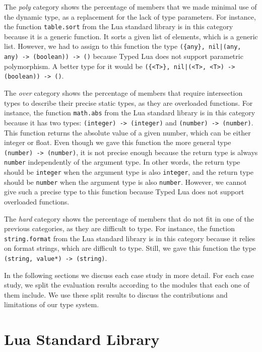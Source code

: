The \emph{poly} category shows the percentage of members that
we made minimal use of the dynamic type, as a replacement for the
lack of type parameters.
For instance, the function \texttt{table.sort} from the Lua
standard library is in this category because it is a generic function.
It sorts a given list of elements, which is a generic list.
However, we had to assign to this function the type
\texttt{(\{any\}, nil|(any, any) -> (boolean)) -> ()} because
Typed Lua does not support parametric polymorphism.
A better type for it would be
\texttt{(\{<T>\}, nil|(<T>, <T>) -> (boolean)) -> ()}.

The \emph{over} category shows the percentage of members that
require intersection types to describe their precise static types,
as they are overloaded functions.
For instance, the function \texttt{math.abs} from the Lua
standard library is in this category because it has two types:
\texttt{(integer) -> (integer)} and \texttt{(number) -> (number)}.
This function returns the absolute value of a given number,
which can be either integer or float.
Even though we gave this function the more general type \texttt{(number) -> (number)},
it is not precise enough because the return type is always \texttt{number}
independently of the argument type.
In other words, the return type should be \texttt{integer} when
the argument type is also \texttt{integer}, and the return type
should be \texttt{number} when the argument type is also \texttt{number}.
However, we cannot give such a precise type to this function because
Typed Lua does not support overloaded functions.

The \emph{hard} category shows the percentage of members that
do not fit in one of the previous categories, as they are difficult to type.
For instance, the function \texttt{string.format} from the Lua
standard library is in this category because it relies on format
strings, which are difficult to type.
Still, we gave this function the type \texttt{(string, value*) -> (string)}.

In the following sections we discuss each case study in more detail.
For each case study, we split the evaluation results according
to the modules that each one of them include.
We use these split results to discuss the contributions and
limitations of our type system.

\section{Lua Standard Library}


